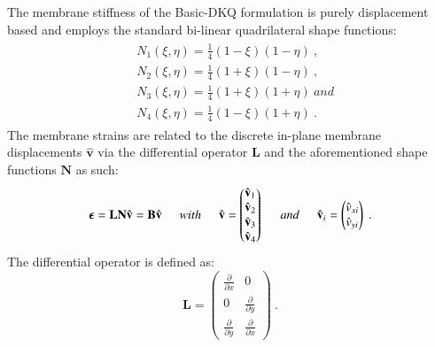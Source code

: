 The membrane stiffness of the Basic-DKQ formulation is purely displacement based and employs the standard bi-linear quadrilateral shape functions:
\begin{gather} 
\begin{aligned}
&N_1 (\xi , \eta) = \frac{1}{4} (1-\xi)(1-\eta)\ ,
\\
&N_2 (\xi , \eta) = \frac{1}{4} (1+\xi)(1-\eta)\ ,
\\
&N_3 (\xi , \eta) = \frac{1}{4} (1+\xi)(1+\eta)\ and
\\
&N_4 (\xi , \eta) = \frac{1}{4} (1-\xi)(1+\eta)
\label{eqApp1_1}\ .
\end{aligned}
\end{gather}
The membrane strains are related to the discrete in-plane membrane displacements $\hat{\mathbf{v}}$ via the differential operator $\mathbf{L}$ and the aforementioned shape functions $\mathbf{N}$ as such:
\begin{equation}
\boldsymbol{\epsilon} = \mathbf{L} \mathbf{N} \hat{\mathbf{v}} = \mathbf{B}  \hat{\mathbf{v}} 
\hspace{5mm}
with
\hspace{5mm}
\hat{\mathbf{v}} = \begin{pmatrix}
\hat{\mathbf{v}}_1 \\
\hat{\mathbf{v}}_2 \\
\hat{\mathbf{v}}_3 \\
\hat{\mathbf{v}}_4 \\
\end{pmatrix}
\hspace{5mm}
and
\hspace{5mm}
\hat{\mathbf{v}}_i = \begin{pmatrix}
\hat{{v}}_{xi} \\
\hat{{v}}_{yi}
\end{pmatrix}
\label{eqApp1_2}\ .
\end{equation}
The differential operator is defined as:
\begin{equation}
\mathbf{L} = \begin{pmatrix}
\frac{\partial}{\partial x} & 0 \\
0 & \frac{\partial}{\partial y}\\
\frac{\partial}{\partial y} & \frac{\partial}{\partial x}
\end{pmatrix}
\label{eqApp1_3}\ .
\end{equation}

